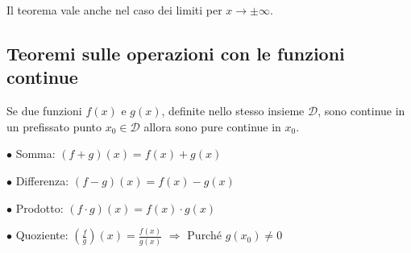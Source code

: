 \documentclass[a4paper,11pt]{article}
\begin{document}
Il teorema vale anche nel caso dei limiti per $x \to \pm \infty$.

\subsection{Teoremi sulle operazioni con le funzioni continue}
Se due funzioni $f(x)$ e $g(x)$, definite nello stesso insieme $\mathcal{D}$, sono continue in un prefissato punto $x_0 \in \mathcal{D}$ allora sono pure continue in $x_0$.

\vspace{1mm}

$\bullet$
Somma: $(f+g)(x)=f(x)+g(x)$

\vspace{1mm}

$\bullet$
Differenza: $(f-g)(x)=f(x)-g(x)$

\vspace{1mm}

$\bullet$
Prodotto: $(f \cdot g)(x)=f(x) \cdot g(x)$

\vspace{1mm}

$\bullet$
Quoziente: $(\frac{f}{g})(x) = \frac{f(x)}{g(x)}$
$\Rightarrow$
Purché $g(x_0) \neq 0$
\end{document}
